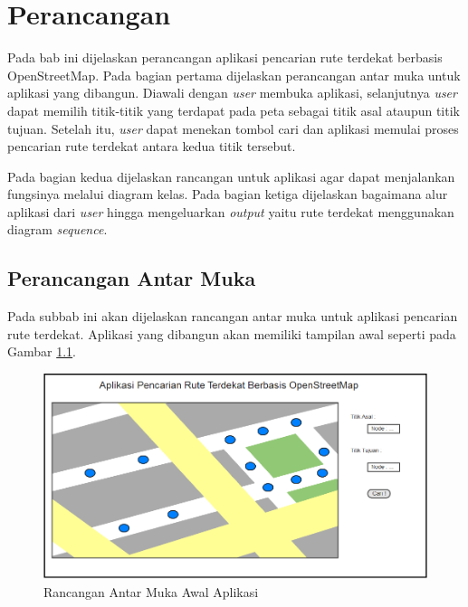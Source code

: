 \chapter{Perancangan}
Pada bab ini dijelaskan perancangan aplikasi pencarian rute terdekat
berbasis OpenStreetMap. Pada bagian pertama dijelaskan perancangan antar
muka untuk aplikasi yang dibangun. Diawali dengan \textit{user} membuka
aplikasi, selanjutnya \textit{user} dapat memilih titik-titik yang terdapat pada
peta sebagai titik asal ataupun titik tujuan. Setelah itu, \textit{user} dapat
menekan tombol cari dan aplikasi memulai proses pencarian rute terdekat antara
kedua titik tersebut.

Pada bagian kedua dijelaskan rancangan untuk aplikasi agar dapat
menjalankan fungsinya melalui diagram kelas. Pada bagian ketiga dijelaskan
bagaimana alur aplikasi dari \textit{user} hingga mengeluarkan \textit{output} yaitu rute terdekat
menggunakan diagram \textit{sequence}.

\section{Perancangan Antar Muka}
Pada subbab ini akan dijelaskan rancangan antar muka untuk aplikasi pencarian
rute terdekat. Aplikasi yang dibangun akan memiliki tampilan awal seperti pada
Gambar \ref{fig:mockup_1}.
\begin{figure}[h]
\centering
\includegraphics[scale=0.57]{Gambar/mockup_1}
\caption[Rancangan Antar Muka Awal Aplikasi]{Rancangan Antar Muka Awal Aplikasi}
\label{fig:mockup_1}
\end{figure}

